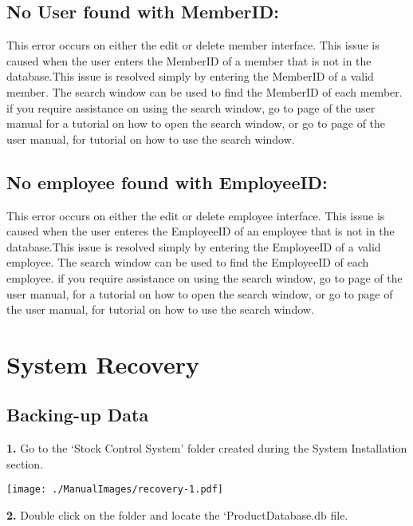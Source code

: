 \subsection{No User found with MemberID:}

This error occurs on either the edit or delete member interface. This issue is caused when the user enters the MemberID of a member that is not in the database.This issue is resolved simply by entering the MemberID of a valid member. The search window can be used to find the MemberID of each member. if you require assistance on using the search window, go to page \pageref{fig:Accessing the search window} of the user manual for a tutorial on how to open the search window, or go to page \pageref{fig:Using the search window} of the user manual, for tutorial on how to use the search window.

\subsection{No employee found with EmployeeID:}

This error occurs on either the edit or delete employee interface. This issue is caused when the user enteres the EmployeeID of an employee that is not in the database.This issue is resolved simply by entering the EmployeeID of a valid employee. The search window can be used to find the EmployeeID of each employee. if you require assistance on using the search window, go to page \pageref{fig:Accessing the search window} of the user manual, for a tutorial on how to open the search window, or go to page \pageref{fig:Using the search window} of the user manual, for tutorial on how to use the search window.



\section{System Recovery}

\subsection{Backing-up Data}

\textbf{1.} Go to the `Stock Control System' folder created during the System Installation section.

\texttt{[image: ./ManualImages/recovery-1.pdf]}

\textbf{2.} Double click on the folder and locate the `ProductDatabase.db file.

